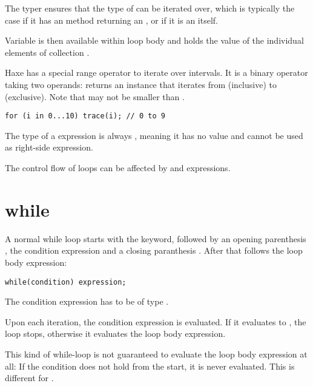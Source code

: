 The typer ensures that the type of  can be iterated over, which is typically the case if it has an  method returning an , or if it is an  itself.

Variable  is then available within loop body  and holds the value of the individual elements of collection .

Haxe has a special range operator to iterate over intervals. It is a binary operator taking two  operands:  returns an  instance that iterates from  (inclusive) to  (exclusive). Note that  may not be smaller than .

\begin{lstlisting}
for (i in 0...10) trace(i); // 0 to 9
\end{lstlisting}

The type of a  expression is always , meaning it has no value and cannot be used as right-side expression.

The control flow of loops can be affected by  and  expressions.

\section{while}
\label{expression-while}

A normal while loop starts with the  keyword, followed by an opening parenthesis \expr{(}, the condition expression and a closing paranthesis \expr{)}. After that follows the loop body expression:

\begin{lstlisting}
while(condition) expression;
\end{lstlisting}

The condition expression has to be of type .

Upon each iteration, the condition expression is evaluated. If it evaluates to , the loop stops, otherwise it evaluates the loop body expression.


This kind of while-loop is not guaranteed to evaluate the loop body expression at all: If the condition does not hold from the start, it is never evaluated. This is different for .

